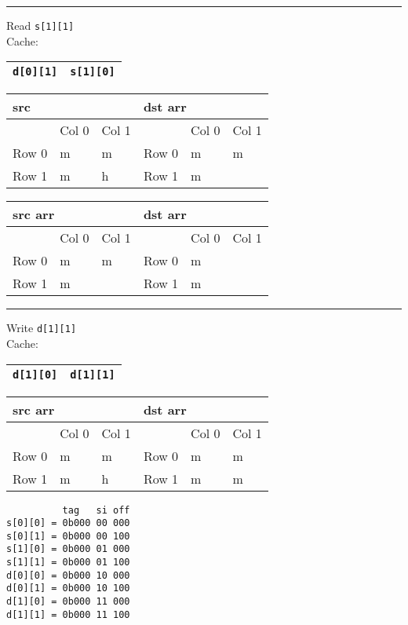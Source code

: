 \noindent
\rule{\textwidth}{1pt}
Read \verb+s[1][1]+\\
Cache:
\begin{tabular}{|l|l|}
\hline
\verb+d[0][1]+ & \verb+s[1][0]+ \\ \hline
\end{tabular}


\noindent
\begin{tabular}{llllll}
\multicolumn{3}{l}{src} & \multicolumn{3}{l}{dst arr} \\ \hline
        & Col 0   & Col 1   &         & Col 0   & Col 1   \\ \hline
Row 0   & m       & m       & Row 0   & m       & m       \\
Row 1   & m       & h       & Row 1   & m       &        
\end{tabular}

\noindent
\begin{tabular}{llllll}
\multicolumn{3}{l}{src arr} & \multicolumn{3}{l}{dst arr} \\ \hline
        & Col 0   & Col 1   &         & Col 0   & Col 1   \\ \hline
Row 0   & m       & m       & Row 0   & m       &         \\
Row 1   & m       &         & Row 1   & m       &        
\end{tabular}

\noindent
\rule{\textwidth}{1pt}
Write \verb+d[1][1]+\\
Cache:
\begin{tabular}{|l|l|}
\hline
\verb+d[1][0]+ & \verb+d[1][1]+ \\ \hline
\end{tabular}


\noindent
\begin{tabular}{llllll}
\multicolumn{3}{l}{src arr} & \multicolumn{3}{l}{dst arr} \\ \hline
        & Col 0   & Col 1   &         & Col 0   & Col 1   \\ \hline
Row 0   & m       & m       & Row 0   & m       & m       \\
Row 1   & m       & h       & Row 1   & m       & m        
\end{tabular}

\clearpage
\begin{verbatim}
          tag   si off
s[0][0] = 0b000 00 000
s[0][1] = 0b000 00 100
s[1][0] = 0b000 01 000
s[1][1] = 0b000 01 100
d[0][0] = 0b000 10 000
d[0][1] = 0b000 10 100
d[1][0] = 0b000 11 000
d[1][1] = 0b000 11 100
\end{verbatim}

